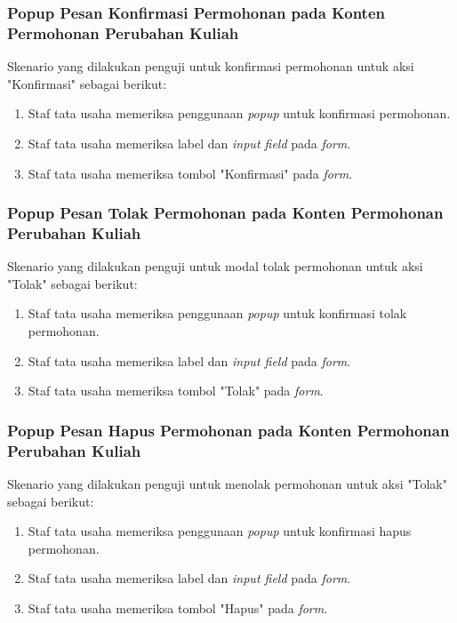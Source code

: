 \subsubsection{Popup Pesan Konfirmasi Permohonan pada Konten Permohonan Perubahan Kuliah}
Skenario yang dilakukan penguji untuk konfirmasi permohonan untuk aksi "Konfirmasi" sebagai berikut:
\begin{enumerate}
	\item Staf tata usaha memeriksa penggunaan \textit{popup} untuk konfirmasi permohonan.
	\item Staf tata usaha memeriksa label dan \textit{input field} pada \textit{form}.
	\item Staf tata usaha memeriksa tombol "Konfirmasi" pada \textit{form}.	
\end{enumerate}

\subsubsection{Popup Pesan Tolak Permohonan pada Konten Permohonan Perubahan Kuliah}
Skenario yang dilakukan penguji untuk modal tolak permohonan untuk aksi "Tolak" sebagai berikut:
\begin{enumerate}
	\item Staf tata usaha memeriksa penggunaan \textit{popup} untuk konfirmasi tolak permohonan.
	\item Staf tata usaha memeriksa label dan \textit{input field} pada \textit{form}.
	\item Staf tata usaha memeriksa tombol "Tolak" pada \textit{form}.	
\end{enumerate}

\subsubsection{Popup Pesan Hapus Permohonan pada Konten Permohonan Perubahan Kuliah}
Skenario yang dilakukan penguji untuk menolak permohonan untuk aksi "Tolak" sebagai berikut:
\begin{enumerate}
	\item Staf tata usaha memeriksa penggunaan \textit{popup} untuk konfirmasi hapus permohonan.
	\item Staf tata usaha memeriksa label dan \textit{input field} pada \textit{form}.
	\item Staf tata usaha memeriksa tombol "Hapus" pada \textit{form}.	
\end{enumerate}

